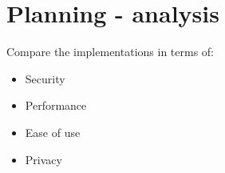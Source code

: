 \hypertarget{planning---analysis}{%
\chapter{Planning - analysis}\label{planning---analysis}}

Compare the implementations in terms of:

\begin{itemize}
\tightlist
\item
  Security
\item
  Performance
\item
  Ease of use
\item
  Privacy
\end{itemize}
